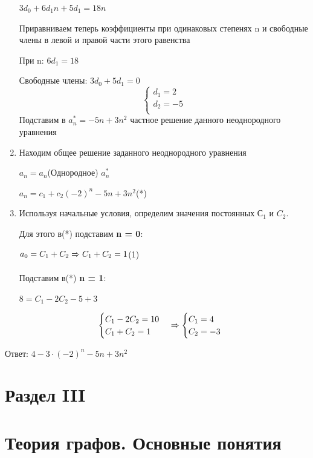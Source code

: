 \documentclass[12pt, a4paper, oneside]{article}
\theoremstyle{plain} %
\theoremstyle{definition}
\begin{document}
\begin{enumerate}
$3 d_0 + 6 d_1 n + 5 d_1 = 18 n $

Приравниваем теперь коэффициенты при одинаковых степенях n и свободные члены в левой и правой части этого равенства 

При n: $6 d_1 = 18$

Свободные члены: $3 d_0 + 5 d_1 = 0$
\[
\begin{cases}
   
    d_1 = 2\\
    
    d_2 = -5\\
    
\end{cases}
\]
Подставим в $a_n^* = - 5n + 3 n^2$ частное решение данного неоднородного уравнения 

\item Находим общее решение заданного неоднородного уравнения 

$a_n = a_n$(Однородное) $a_n^* $

$a_n = c_1 + c_2 (-2)^n - 5n + 3 n^2$(*)

\item Используя начальные условия, определим значения постоянных $С_1$  и $C_2$.

Для этого в(*) подставим \textbf{n = 0}:

$a_0 = C_1 + C_2 \xRightarrow[]{} C_1 + C_2 = 1$(1)

Подставим в(*) \textbf{n = 1}:

$8= C_1 - 2 C_2 -5 + 3$

\[
\begin{cases}
    C_1 - 2 C_2 = 10\\
    
    C_1 + C_2 = 1\\
\end{cases}
\xRightarrow[]{}
\begin{cases}
    C_1 = 4\\
    
    C_2 = -3\\
    
\end{cases}
\]
\end{enumerate}

Ответ: $4 - 3 \cdot (-2)^n - 5n + 3 n^2$

\section*{\textbf{Раздел III}}

\section{Теория графов. Основные понятия} 
\end{document}

